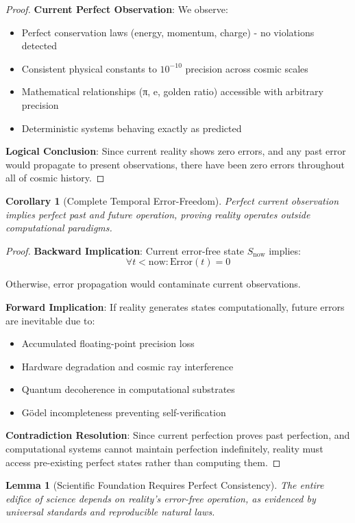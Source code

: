 \documentclass[12pt,a4paper]{article}
\newtheorem{lemma}[theorem]{Lemma}
\newtheorem{corollary}[theorem]{Corollary}
\begin{document}
\begin{proof}
\textbf{Current Perfect Observation}: We observe:
\begin{itemize}
    \item Perfect conservation laws (energy, momentum, charge) - no violations detected
    \item Consistent physical constants to $10^{-10}$ precision across cosmic scales
    \item Mathematical relationships (π, e, golden ratio) accessible with arbitrary precision
    \item Deterministic systems behaving exactly as predicted
\end{itemize}

\textbf{Logical Conclusion}: Since current reality shows zero errors, and any past error would propagate to present observations, there have been zero errors throughout all of cosmic history.
\end{proof}

\begin{corollary}[Complete Temporal Error-Freedom]
Perfect current observation implies perfect past and future operation, proving reality operates outside computational paradigms.
\end{corollary}

\begin{proof}
\textbf{Backward Implication}: Current error-free state $S_{\text{now}}$ implies:
$$\forall t < \text{now}: \text{Error}(t) = 0$$

Otherwise, error propagation would contaminate current observations.

\textbf{Forward Implication}: If reality generates states computationally, future errors are inevitable due to:
\begin{itemize}
    \item Accumulated floating-point precision loss
    \item Hardware degradation and cosmic ray interference
    \item Quantum decoherence in computational substrates
    \item Gödel incompleteness preventing self-verification
\end{itemize}

\textbf{Contradiction Resolution}: Since current perfection proves past perfection, and computational systems cannot maintain perfection indefinitely, reality must access pre-existing perfect states rather than computing them.
\end{proof}

\begin{lemma}[Scientific Foundation Requires Perfect Consistency]
The entire edifice of science depends on reality's error-free operation, as evidenced by universal standards and reproducible natural laws.
\end{lemma}
\end{document}
